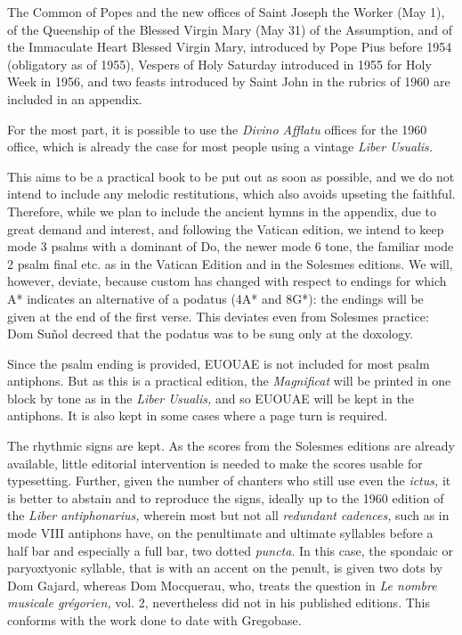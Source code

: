 \begin{enpars}
The Common of Popes and the new offices of Saint Joseph the Worker (May 1), of the Queenship of the Blessed Virgin Mary (May 31) of the Assumption, and of the Immaculate Heart Blessed Virgin Mary, introduced by Pope Pius  before 1954 (obligatory as of 1955), Vespers of Holy Saturday introduced in 1955 for Holy Week in 1956, and two feasts introduced by Saint John  in the rubrics of 1960 are included in an appendix.

For the most part, it is possible to use the \textit{Divino Afflatu} offices for the 1960 office, which is already the case for most people using a vintage \textit{Liber Usualis.}

This aims to be a practical book to be put out as soon as possible, and we do not intend to include any melodic restitutions, which also avoids upseting the faithful. Therefore, while we plan to include the ancient hymns in the appendix, due to great demand and interest, and following the Vatican edition, we intend to keep mode 3 psalms with a dominant of Do, the newer mode 6 tone, the familiar mode 2 psalm final etc. as in the Vatican Edition and in the Solesmes editions. We will, however, deviate, because custom has changed with respect to endings for which A* indicates an alternative of a podatus (4A* and 8G*): the endings will be given at the end of the first verse. This deviates even from Solesmes practice: Dom Suñol decreed that the podatus was to be sung only at the doxology.

Since the psalm ending is provided, EUOUAE is not included for most psalm antiphons. But as this is a practical edition, the \textit{Magnificat} will be printed in one block by tone as in the \textit{Liber Usualis,} and so EUOUAE will be kept in the antiphons. It is also kept in some cases where a page turn is required.

The rhythmic signs are kept. As the scores from the Solesmes editions are already available, little editorial intervention is needed to make the scores usable for typesetting. Further, given the number of chanters who still use even the \textit{ictus,}  it is better to abstain and to reproduce the signs, ideally up to the 1960 edition of the \textit{Liber antiphonarius,} wherein most but not all \textit{redundant cadences,} such as in mode VIII antiphons have, on the penultimate and ultimate syllables before a half bar and especially a full bar, two dotted \textit{puncta}. In this case, the spondaic or paryoxtyonic syllable, that is with an accent on the penult, is given two dots by Dom Gajard, whereas Dom Mocquerau, who, treats the question in \textit{Le nombre musicale grégorien,} vol. 2, nevertheless did not in his published editions. This conforms with the work done to date with Gregobase.


\end{enpars}
